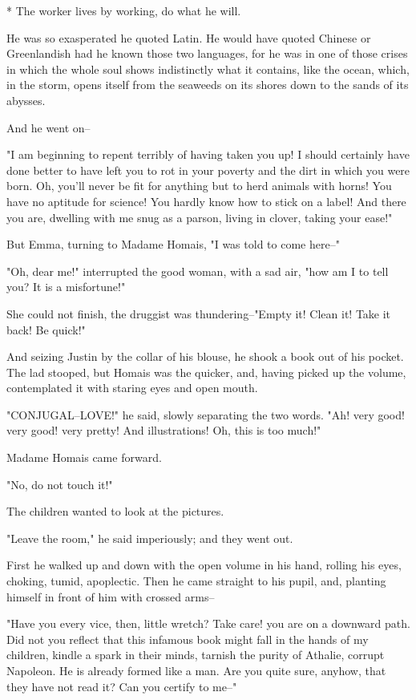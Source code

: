 \documentclass[11pt,twocolumn]{ltugboat}
\begin{document}
     * The worker lives by working, do what he will.


He was so exasperated he quoted Latin. He would have quoted Chinese
or Greenlandish had he known those two languages, for he was in one
of those crises in which the whole soul shows indistinctly what it
contains, like the ocean, which, in the storm, opens itself from the
seaweeds on its shores down to the sands of its abysses.

And he went on--

"I am beginning to repent terribly of having taken you up! I should
certainly have done better to have left you to rot in your poverty and
the dirt in which you were born. Oh, you'll never be fit for anything
but to herd animals with horns! You have no aptitude for science! You
hardly know how to stick on a label! And there you are, dwelling with me
snug as a parson, living in clover, taking your ease!"

But Emma, turning to Madame Homais, "I was told to come here--"

"Oh, dear me!" interrupted the good woman, with a sad air, "how am I to
tell you? It is a misfortune!"

She could not finish, the druggist was thundering--"Empty it! Clean it!
Take it back! Be quick!"

And seizing Justin by the collar of his blouse, he shook a book out of
his pocket. The lad stooped, but Homais was the quicker, and, having
picked up the volume, contemplated it with staring eyes and open mouth.

"CONJUGAL--LOVE!" he said, slowly separating the two words. "Ah! very
good! very good! very pretty! And illustrations! Oh, this is too much!"

Madame Homais came forward.

"No, do not touch it!"

The children wanted to look at the pictures.

"Leave the room," he said imperiously; and they went out.

First he walked up and down with the open volume in his hand, rolling
his eyes, choking, tumid, apoplectic. Then he came straight to his
pupil, and, planting himself in front of him with crossed arms--

"Have you every vice, then, little wretch? Take care! you are on a
downward path. Did not you reflect that this infamous book might fall
in the hands of my children, kindle a spark in their minds, tarnish the
purity of Athalie, corrupt Napoleon. He is already formed like a man.
Are you quite sure, anyhow, that they have not read it? Can you certify
to me--"
\end{document}
